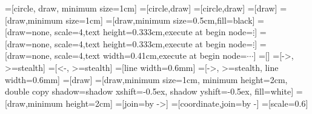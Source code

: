 \newcommand{\dataLabelScale}{0.6}
\newcommand{\schemeNodeDistance}{0.5cm}

=[circle, draw, minimum size=1cm]
=[circle,draw]
=[circle,draw]
=[draw]
=[draw,minimum size=1cm]
=[draw,minimum size=0.5cm,fill=black]
=[draw=none, scale=4,text height=0.333cm,execute at begin node=\color{black}$\vdots$]
=[draw=none, scale=4,text height=0.333cm,execute at begin node=\color{black}$\vdots$]
=[draw=none, scale=4,text width=0.41cm,execute at
begin node=\color{black}$\cdots$]
=[]
=[->, >=stealth]
=[<-, >=stealth]
=[line width=0.6mm]
=[->, >=stealth, line width=0.6mm]
=[draw]
=[draw,minimum size=1cm, minimum height=2cm, double copy shadow={shadow xshift=-0.5ex, shadow yshift=-0.5ex}, fill=white]
=[draw,minimum height=2cm]
=[join=by {->}]
=[coordinate,join=by {-}]
=[scale=\dataLabelScale]

\newcommand\nodeInput{} %
\def\nodeInput(#1){%
  \node[dataBlock,joined,scale=\dataLabelScale] (#1) {$200$};
}

\newcommand\nodeEmbedding{} %
\def\nodeEmbedding(#1){%
  \node[layer,joined] (#1) {\rotatebox{90}{Embed}};
}

\newcommand\nodeGlove{} %
\def\nodeGlove(#1){%
  \node[layer,joined] (#1) {\rotatebox{90}{GloVe}};
}

\newcommand\nodeConv{} %
\def\nodeConv(#1){%
  \node[layer,joined] (#1) {\rotatebox{90}{Conv 2}};
}

\newcommand\nodeLstm{} %
\def\nodeLstm(#1){%
  \node[layer,joined] (#1) {\rotatebox{90}{Bi. LSTM}};
}

\newcommand\nodeAvg{} %
\def\nodeAvg(#1){%
  \node[layer,joined] (#1) {\rotatebox{90}{Avg pool}};
}

\newcommand\nodeRelu{} %
\def\nodeRelu(#1){%
  \node[layer,joined] (#1) {\rotatebox{90}{ReLU}};
}

\newcommand\nodeSoftmax{} %
\def\nodeSoftmax(#1){%
  \node[layer,joined] (#1) {\rotatebox{90}{Softmax}};
}

